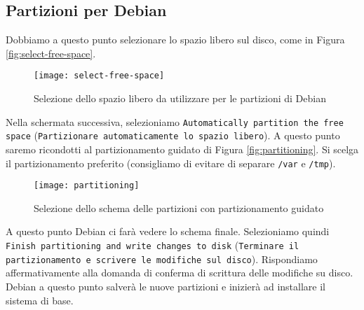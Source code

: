 \subsection{Partizioni per Debian}
Dobbiamo a questo punto selezionare lo spazio libero sul disco, come in Figura \vref{fig:select-free-space}.

\begin{figure}[ht]
	\centering
	\texttt{[image: select-free-space]}
	\caption{Selezione dello spazio libero da utilizzare per le partizioni di Debian}
	\label{fig:select-free-space}
\end{figure}

Nella schermata successiva, selezioniamo \texttt{Automatically parti\-tion the free space} (\texttt{Partizionare automaticamente lo spa\-zio libero}). A questo punto saremo ricondotti al partizionamento guidato di Figura \vref{fig:partitioning}. Si scelga il partizionamento preferito (consigliamo di evitare di separare \texttt{/var} e \texttt{/tmp}).

\begin{figure}[ht]
	\centering
	\texttt{[image: partitioning]}
	\caption{Selezione dello schema delle partizioni con partizionamento guidato}
	\label{fig:partitioning}
\end{figure}

A questo punto Debian ci farà vedere lo schema finale. Selezioniamo quindi \texttt{Finish partitioning and write changes to disk} (\texttt{Terminare il partizionamento e scrivere le modifiche sul disco}). Rispondiamo affermativamente alla domanda di conferma di scrittura delle modifiche su disco. Debian a questo punto salverà le nuove partizioni e inizierà ad installare il sistema di base.
